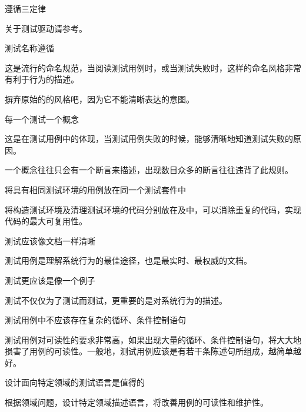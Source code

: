 \begin{content}

\begin{regulation}
遵循三定律
\end{regulation}

\begin{enum}
\end{enum}

关于测试驱动请参考。

\begin{regulation}
测试名称遵循
\end{regulation}

这是流行的命名规范，当阅读测试用例时，或当测试失败时，这样的命名风格非常有利于行为的描述。

摒弃原始的的风格吧，因为它不能清晰表达的意图。

\begin{regulation}
每一个测试一个概念
\end{regulation}

这是在测试用例中的体现，当测试用例失败的时候，能够清晰地知道测试失败的原因。

一个概念往往只会有一个断言来描述，出现数目众多的断言往往违背了此规则。

\begin{regulation}
将具有相同测试环境的用例放在同一个测试套件中
\end{regulation}

将构造测试环境及清理测试环境的代码分别放在及中，可以消除重复的代码，实现代码的最大可复用性。

\begin{regulation}
测试应该像文档一样清晰
\end{regulation}

测试用例是理解系统行为的最佳途径，也是最实时、最权威的文档。

\begin{regulation}
测试更应该是像一个例子
\end{regulation}

测试不仅仅为了测试而测试，更重要的是对系统行为的描述。

\begin{regulation}
测试用例中不应该存在复杂的循环、条件控制语句
\end{regulation}

测试用例对可读性的要求非常高，如果出现大量的循环、条件控制语句，将大大地损害了用例的可读性。一般地，测试用例应该是有若干条陈述句所组成，越简单越好。

\begin{regulation}
设计面向特定领域的测试语言是值得的
\end{regulation}

根据领域问题，设计特定领域描述语言，将改善用例的可读性和维护性。

\end{content}
